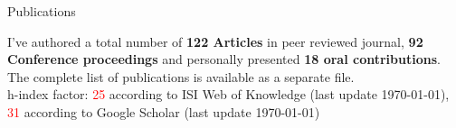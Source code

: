 \begin{cvblock}{Publications}
\end{cvblock}
I've authored a total number of \textbf{122 Articles} in peer reviewed journal,
\textbf{92 Conference proceedings} and personally presented \textbf{18 oral
contributions}. The complete list of publications is available as a
separate file. \\
h-index factor: \textcolor{red}{25} according to ISI Web of Knowledge
(last update \today), \textcolor{red}{31} according to Google Scholar (last update \today)


